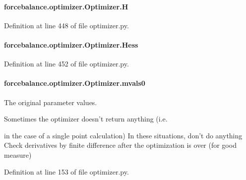 \hypertarget{classforcebalance_1_1optimizer_1_1Optimizer_a7cf404b3b15afec4237344f09a31b6c7}{
\paragraph[{H}]{\setlength{\rightskip}{0pt plus 5cm}forcebalance.\-optimizer.\-Optimizer.\-H}}\label{classforcebalance_1_1optimizer_1_1Optimizer_a7cf404b3b15afec4237344f09a31b6c7}


Definition at line 448 of file optimizer.\-py.

\hypertarget{classforcebalance_1_1optimizer_1_1Optimizer_ab99276420d1c28932d2559c7f8e88922}{
\paragraph[{Hess}]{\setlength{\rightskip}{0pt plus 5cm}forcebalance.\-optimizer.\-Optimizer.\-Hess}}\label{classforcebalance_1_1optimizer_1_1Optimizer_ab99276420d1c28932d2559c7f8e88922}


Definition at line 452 of file optimizer.\-py.

\hypertarget{classforcebalance_1_1optimizer_1_1Optimizer_aa1d7f33ea1c9341fb1c867ef01752a16}{
\paragraph[{mvals0}]{\setlength{\rightskip}{0pt plus 5cm}forcebalance.\-optimizer.\-Optimizer.\-mvals0}}\label{classforcebalance_1_1optimizer_1_1Optimizer_aa1d7f33ea1c9341fb1c867ef01752a16}


The original parameter values. 

Sometimes the optimizer doesn't return anything (i.\-e.

in the case of a single point calculation) In these situations, don't do anything Check derivatives by finite difference after the optimization is over (for good measure) 

Definition at line 153 of file optimizer.\-py.

